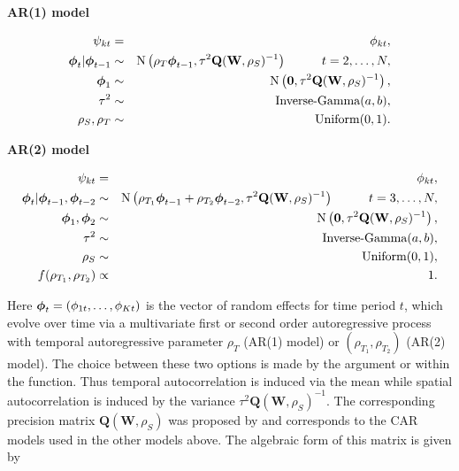\documentclass[article, nojss]{jss}
\newcommand{\bd}[1]{\ensuremath{\mbox{\boldmath $#1$}}}
\begin{document}
\textbf{AR(1) model}


\begin{eqnarray}
\psi_{kt}&=&\phi_{kt},\label{carar}\\
\bd{\phi}_t|\bd{\phi}_{t-1} & \sim & \mbox{N}\left(\rho_T\bd{\phi}_{t-1}, \tau^{2} \mathbf{Q}(\mathbf{W},\rho_S)^{-1}\right)\hspace{1cm} t=2,\ldots,N,\nonumber\\
\bd{\phi}_1 & \sim & \mbox{N}\left(\mathbf{0}, \tau^{2} \mathbf{Q}(\mathbf{W},\rho_S)^{-1}\right),\nonumber\\
\tau^2&\sim&\mbox{Inverse-Gamma}(a,b),\nonumber\\
\rho_S,\rho_T&\sim&\mbox{Uniform}(0,1).\nonumber
\end{eqnarray}


\textbf{AR(2) model}


\begin{eqnarray}
\psi_{kt}&=&\phi_{kt},\label{carar2}\\
\bd{\phi}_t|\bd{\phi}_{t-1}, \bd{\phi}_{t-2} & \sim & \mbox{N}\left(\rho_{T_1}\bd{\phi}_{t-1}+\rho_{T_2}\bd{\phi}_{t-2}, \tau^{2} \mathbf{Q}(\mathbf{W},\rho_S)^{-1}\right)\hspace{1cm} t=3,\ldots,N,\nonumber\\
\bd{\phi}_1, \bd{\phi}_2 & \sim & \mbox{N}\left(\mathbf{0}, \tau^{2} \mathbf{Q}(\mathbf{W},\rho_S)^{-1}\right),\nonumber\\
\tau^2&\sim&\mbox{Inverse-Gamma}(a,b),\nonumber\\
\rho_S&\sim&\mbox{Uniform}(0,1),\nonumber\\
f(\rho_{T_1}, \rho_{T_2}) &\propto&1.\nonumber
\end{eqnarray}


Here $\bd{\phi}_{t}=(\phi_{1t},\ldots,\phi_{Kt})$ is the vector of random effects for time period $t$, which  evolve over time via a multivariate first or second order autoregressive process with temporal autoregressive parameter $\rho_T$ (AR(1) model) or $(\rho_{T_1}, \rho_{T_2})$ (AR(2) model). The choice between these two options is made by the argument   or  within the function. Thus temporal autocorrelation is induced via the mean  while spatial autocorrelation is induced by the variance $\tau^{2} \mathbf{Q}(\mathbf{W},\rho_S)^{-1}$. The corresponding precision matrix $\mathbf{Q}(\mathbf{W},\rho_S)$ was proposed by \cite{leroux2000} and corresponds to the CAR models used in the other models above. The algebraic form of this matrix is given by
\end{document}
